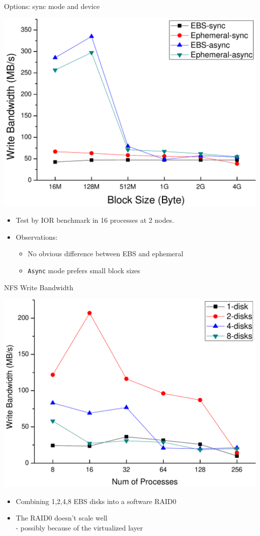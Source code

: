 \documentclass{beamer}
\begin{document}
\begin{frame}{Options: sync mode and device}
    \begin{center}
        \includegraphics[width=.55\textwidth]{figures/nfs-write}
    \end{center}
    \begin{itemize}
        \item Test by IOR benchmark in 16 processes at 2 nodes.
        \pause
        \item Observations:
            \begin{itemize}
                \item No obvious difference between EBS and ephemeral
                \pause
                \item \texttt{Async} mode prefers small block sizes
            \end{itemize}
    \end{itemize}
\end{frame}

\begin{frame}{NFS Write Bandwidth}
    \begin{center}
        \includegraphics[width=.55\textwidth]{figures/nfs-raid0-write}
    \end{center}
    \begin{itemize}
        \item Combining 1,2,4,8 EBS disks into a software RAID0
        \pause
        \item The RAID0 doesn't scale well\\
            - possibly because of the virtualized layer
    \end{itemize}
\end{frame}
\end{document}
